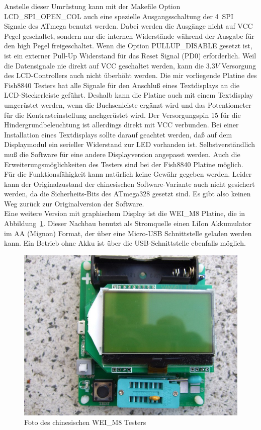 Anstelle dieser Umrüstung kann mit der Makefile Option LCD\_SPI\_OPEN\_COL auch eine spezielle Ausgangsschaltung
der 4~SPI Signale des ATmega benutzt werden.
Dabei werden die Ausgänge nicht auf VCC Pegel geschaltet,
sondern nur die internen  Widerstände während der Ausgabe für den high Pegel freigeschaltet.
Wenn die Option PULLUP\_DISABLE gesetzt ist, ist ein externer Pull-Up Widerstand für das
Reset Signal (PD0) erforderlich.
Weil die Datensignale nie direkt auf VCC geschaltet werden, kann die \(3.3V\) Versorgung des LCD-Controllers
auch nicht überhöht werden.
Die mir vorliegende Platine des Fish8840 Testers hat alle Signale für den Anschluß eines
Textdisplays an die LCD-Steckerleiste geführt. 
Deshalb kann die Platine auch mit einem Textdisplay umgerüstet werden, wenn die Buchsenleiste
ergänzt wird und das Potentiometer für die Kontrasteinstellung nachgerüstet wird.
Der Versorgungspin 15 für die Hindergrundbeleuchtung ist allerdings direkt mit VCC verbunden.
Bei einer Installation eines Textdisplays sollte darauf geachtet werden, daß auf dem Displaymodul
ein serieller Widerstand zur LED vorhanden ist.
Selbstverständlich muß die Software für eine andere Displayversion angepasst werden.
Auch die Erweiterungsmöglichkeiten des Testers sind bei der Fish8840 Platine möglich.\\

Für die Funktionsfähigkeit kann natürlich keine Gewähr gegeben werden.
Leider kann der Originalzustand der chinesischen Software-Variante auch nicht gesichert werden,
da die Sicherheits-Bits des ATmega328 gesetzt sind.
Es gibt also keinen Weg zurück zur Originalversion der Software.\\ 

Eine weitere Version mit graphischem Display ist die WEI\_M8 Platine, die in Abbildung~\ref{fig:WeiM8}.
Dieser Nachbau benutzt als Stromquelle einen LiIon Akkumulator im AA (Mignon) Format, der über
eine Micro-USB Schnittstelle geladen werden kann. Ein Betrieb ohne Akku ist über die USB-Schnittstelle
ebenfalls möglich.

\begin{figure}[H]
\centering
\includegraphics[width=.7\textwidth]{../PNG/WEI_M8.JPG}	%
\caption{Foto des chinesischen WEI\_M8 Testers}
\label{fig:WeiM8}
\end{figure}

